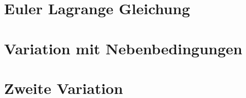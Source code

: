 \section{Euler Lagrange Gleichung}

\section{Variation mit Nebenbedingungen}

\section{Zweite Variation}

